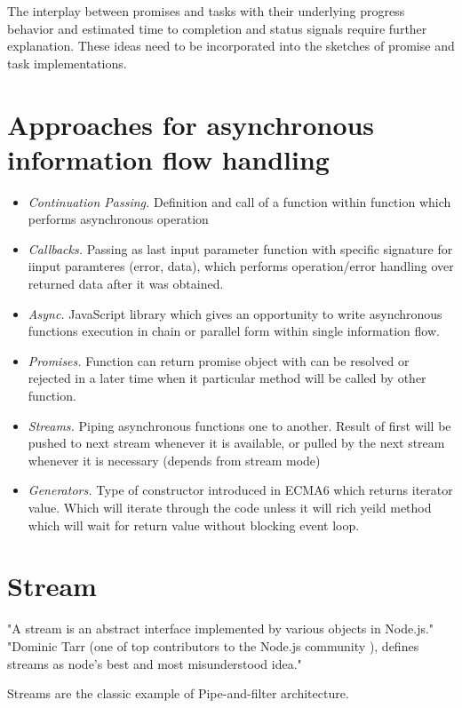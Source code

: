 The interplay between promises and tasks with their underlying progress behavior and estimated time to completion and status signals require further explanation. These ideas need to be incorporated into the sketches of promise and task implementations.

\section{Approaches for asynchronous information flow handling}
\begin{itemize}
	\item \textit{Continuation Passing.} Definition and call of a function within function which performs asynchronous operation
	\item \textit{Callbacks.} Passing as last input parameter function with specific signature for iinput paramteres (error, data), which performs operation/error handling over returned data after it was obtained.
	\item \textit{Async.} JavaScript library which gives an opportunity to write asynchronous functions execution in chain or parallel form within single information flow.
	\item \textit{Promises.} Function can return promise object with can be resolved or rejected in a later time when it particular method will be called by other function.
	\item\textit{Streams.} Piping asynchronous functions one to another. Result of first will be pushed to next stream whenever it is available, or pulled by the next stream whenever it is necessary (depends from stream mode)
	\item\textit{Generators.} Type of constructor introduced in ECMA6 which returns iterator value. Which will iterate through the code unless it will rich yeild method which will wait for return value without blocking event loop.

\end{itemize}

\section{Stream}
"A stream is an abstract interface implemented by various objects in Node.js." \cite{nodejsstreams}
"Dominic Tarr (one of top contributors to the Node.js community \cite{nodejscontributors}), defines streams as node's best and most misunderstood idea."\cite{nodejsbook}

Streams are the classic example of Pipe-and-filter architecture.

